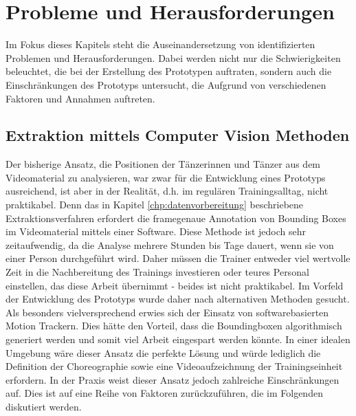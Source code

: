 \documentclass[
  ngerman,
  a4paper,  %
  twoside,  %
  bibliography=totoc,
  headsepline,
  cleardoublepage=empty,
  parskip=half,
  draft=false
]{scrbook}
\begin{document}
\chapter{Probleme und Herausforderungen}
Im Fokus dieses Kapitels steht die Auseinandersetzung von identifizierten Problemen und Herausforderungen. Dabei werden nicht nur die Schwierigkeiten beleuchtet, die bei der Erstellung des Prototypen auftraten, sondern auch die Einschränkungen des Prototyps untersucht, die Aufgrund von verschiedenen Faktoren und Annahmen auftreten.
\section{Extraktion mittels Computer Vision Methoden}

Der bisherige Ansatz, die Positionen der Tänzerinnen und Tänzer aus dem Videomaterial zu analysieren, war zwar für die Entwicklung eines Prototyps ausreichend, ist aber in der Realität, d.h. im regulären Trainingsalltag, nicht praktikabel. Denn das in Kapitel \ref{chp:datenvorbereitung} beschriebene Extraktionsverfahren erfordert die framegenaue Annotation von Bounding Boxes im Videomaterial mittels einer Software. Diese Methode ist jedoch sehr zeitaufwendig, da die Analyse mehrere Stunden bis Tage dauert, wenn sie von einer Person durchgeführt wird. Daher müssen die Trainer entweder viel wertvolle Zeit in die Nachbereitung des Trainings investieren oder teures Personal einstellen, das diese Arbeit übernimmt - beides ist nicht praktikabel.
Im Vorfeld der Entwicklung des Prototyps wurde daher nach alternativen Methoden gesucht. Als besonders vielversprechend erwies sich der Einsatz von softwarebasierten Motion Trackern. Dies hätte den Vorteil, dass die Boundingboxen algorithmisch generiert werden und somit viel Arbeit eingespart werden könnte. In einer idealen Umgebung wäre dieser Ansatz die perfekte Lösung und würde lediglich die Definition der Choreographie sowie eine Videoaufzeichnung der Trainingseinheit erfordern. In der Praxis weist dieser Ansatz jedoch zahlreiche Einschränkungen auf. Dies ist auf eine Reihe von Faktoren zurückzuführen, die im Folgenden diskutiert werden.
\end{document}

